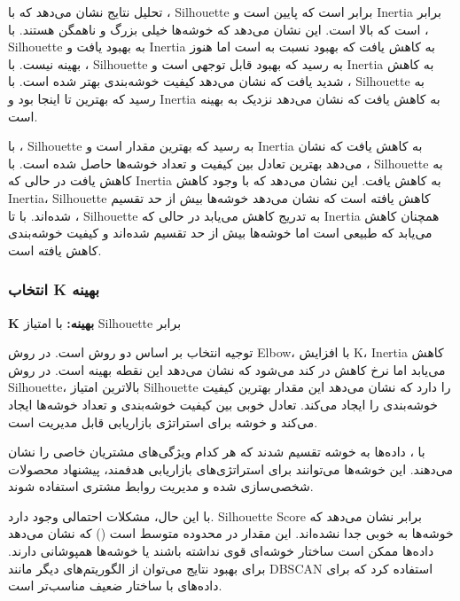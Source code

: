 \documentclass{article}
\begin{document}
تحلیل نتایج نشان می‌دهد که با ، Silhouette برابر  است که پایین است و Inertia برابر  است که بالا است. این نشان می‌دهد که خوشه‌ها خیلی بزرگ و ناهمگن هستند. با ، Silhouette به  بهبود یافت و Inertia به  کاهش یافت که بهبود نسبت به  است اما هنوز بهینه نیست. با ، Silhouette به  رسید که بهبود قابل توجهی است و Inertia به  کاهش شدید یافت که نشان می‌دهد کیفیت خوشه‌بندی بهتر شده است. با ، Silhouette به  رسید که بهترین تا اینجا بود و Inertia به  کاهش یافت که نشان می‌دهد نزدیک به بهینه است.

با ، Silhouette به  رسید که بهترین مقدار است و Inertia به  کاهش یافت که نشان می‌دهد بهترین تعادل بین کیفیت و تعداد خوشه‌ها حاصل شده است. با ، Silhouette به  کاهش یافت در حالی که Inertia به  کاهش یافت. این نشان می‌دهد که با وجود کاهش Inertia، Silhouette کاهش یافته است که نشان می‌دهد خوشه‌ها بیش از حد تقسیم شده‌اند. با  تا ، Silhouette به تدریج کاهش می‌یابد در حالی که Inertia همچنان کاهش می‌یابد که طبیعی است اما خوشه‌ها بیش از حد تقسیم شده‌اند و کیفیت خوشه‌بندی کاهش یافته است.

\subsubsection{انتخاب K بهینه}

\textbf{K بهینه: } با امتیاز Silhouette برابر 

توجیه انتخاب  بر اساس دو روش است. در روش Elbow، با افزایش K، Inertia کاهش می‌یابد اما نرخ کاهش در  کند می‌شود که نشان می‌دهد این نقطه بهینه است. در روش Silhouette،  بالاترین امتیاز Silhouette را دارد که نشان می‌دهد این مقدار بهترین کیفیت خوشه‌بندی را ایجاد می‌کند.  تعادل خوبی بین کیفیت خوشه‌بندی و تعداد خوشه‌ها ایجاد می‌کند و  خوشه برای استراتژی بازاریابی قابل مدیریت است.

با ، داده‌ها به  خوشه تقسیم شدند که هر کدام ویژگی‌های مشتریان خاصی را نشان می‌دهند. این خوشه‌ها می‌توانند برای استراتژی‌های بازاریابی هدفمند، پیشنهاد محصولات شخصی‌سازی شده و مدیریت روابط مشتری استفاده شوند.

با این حال، مشکلات احتمالی وجود دارد. Silhouette Score برابر  نشان می‌دهد که خوشه‌ها به خوبی جدا نشده‌اند. این مقدار در محدوده متوسط است () که نشان می‌دهد داده‌ها ممکن است ساختار خوشه‌ای قوی نداشته باشند یا خوشه‌ها همپوشانی دارند. برای بهبود نتایج می‌توان از الگوریتم‌های دیگر مانند DBSCAN استفاده کرد که برای داده‌های با ساختار ضعیف مناسب‌تر است.
\end{document}

